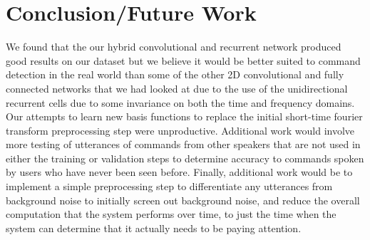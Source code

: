\documentclass{article}
\begin{document}
\section{Conclusion/Future Work }
We found that the our hybrid convolutional and recurrent network
produced good results on our dataset but we believe it would be better
suited to command detection in the real world than some of the other 2D
convolutional and fully connected networks that we had looked at due
to the use of the unidirectional recurrent cells due to
some invariance on both the time and frequency domains. Our attempts
to learn new basis functions to replace the initial short-time fourier
transform preprocessing step were unproductive. Additional work would
involve more testing of utterances of commands from other speakers
that are not used in either the training or validation steps to
determine accuracy to commands spoken by users who have never been
seen before. Finally, additional work would be to implement a simple
preprocessing step to differentiate any utterances from background
noise to initially screen out background noise, and reduce the overall
computation that the system performs over time, to just the time when
the system can determine that it actually needs to be paying attention.

{}


\newpage
\end{document}
